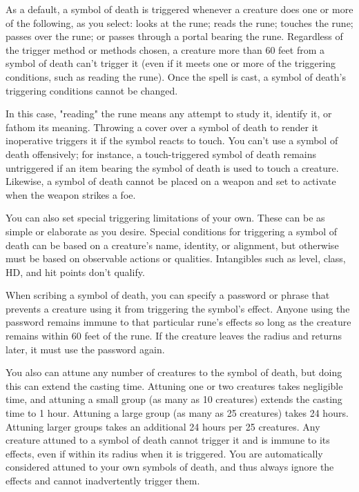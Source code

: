 {As a default, a symbol of death is triggered whenever a creature does one or more of the following, as you select: looks at the rune; reads the rune; touches the rune; passes over the rune; or passes through a portal bearing the rune. Regardless of the trigger method or methods chosen, a creature more than 60 feet from a symbol of death can't trigger it (even if it meets one or more of the triggering conditions, such as reading the rune). Once the spell is cast, a symbol of death's triggering conditions cannot be changed.

In this case, "reading" the rune means any attempt to study it, identify it, or fathom its meaning. Throwing a cover over a symbol of death to render it inoperative triggers it if the symbol reacts to touch. You can't use a symbol of death offensively; for instance, a touch-triggered symbol of death remains untriggered if an item bearing the symbol of death is used to touch a creature. Likewise, a symbol of death cannot be placed on a weapon and set to activate when the weapon strikes a foe.

You can also set special triggering limitations of your own. These can be as simple or elaborate as you desire. Special conditions for triggering a symbol of death can be based on a creature's name, identity, or alignment, but otherwise must be based on observable actions or qualities. Intangibles such as level, class, HD, and hit points don't qualify.

When scribing a symbol of death, you can specify a password or phrase that prevents a creature using it from triggering the symbol's effect. Anyone using the password remains immune to that particular rune's effects so long as the creature remains within 60 feet of the rune. If the creature leaves the radius and returns later, it must use the password again.

You also can attune any number of creatures to the symbol of death, but doing this can extend the casting time. Attuning one or two creatures takes negligible time, and attuning a small group (as many as 10 creatures) extends the casting time to 1 hour. Attuning a large group (as many as 25 creatures) takes 24 hours. Attuning larger groups takes an additional 24 hours per 25 creatures. Any creature attuned to a symbol of death cannot trigger it and is immune to its effects, even if within its radius when it is triggered. You are automatically considered attuned to your own symbols of death, and thus always ignore the effects and cannot inadvertently trigger them.

}
